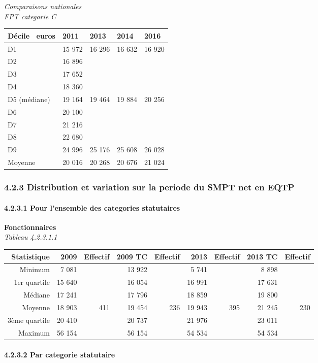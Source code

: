 \emph{Comparaisons nationales}\\
\emph{FPT categorie C}

\begin{longtable}[]{@{}lllll@{}}
\toprule
Décile ~euros & 2011 & 2013 & 2014 & 2016\tabularnewline
\midrule
\endhead
D1 & 15 972 & 16 296 & 16 632 & 16 920\tabularnewline
D2 & 16 896 & & &\tabularnewline
D3 & 17 652 & & &\tabularnewline
D4 & 18 360 & & &\tabularnewline
D5 (médiane) & 19 164 & 19 464 & 19 884 & 20 256\tabularnewline
D6 & 20 100 & & &\tabularnewline
D7 & 21 216 & & &\tabularnewline
D8 & 22 680 & & &\tabularnewline
D9 & 24 996 & 25 176 & 25 608 & 26 028\tabularnewline
Moyenne & 20 016 & 20 268 & 20 676 & 21 024\tabularnewline
\bottomrule
\end{longtable}

\hypertarget{distribution-et-variation-sur-la-periode-du-smpt-net-en-eqtp}{%
\subsubsection{4.2.3 Distribution et variation sur la periode du SMPT
net en
EQTP}\label{distribution-et-variation-sur-la-periode-du-smpt-net-en-eqtp}}

\hypertarget{pour-lensemble-des-categories-statutaires}{%
\paragraph{4.2.3.1 Pour l'ensemble des categories
statutaires}\label{pour-lensemble-des-categories-statutaires}}

\textbf{Fonctionnaires}\\
\hspace*{0.333em}\emph{Tableau 4.2.3.1.1}

\begin{longtable}[]{@{}rrrrrrrrr@{}}
\toprule
Statistique & 2009 & Effectif & 2009 TC & Effectif & 2013 & Effectif &
2013 TC & Effectif\tabularnewline
\midrule
\endhead
Minimum & 7 081 & & 13 922 & & 5 741 & & 8 898 &\tabularnewline
1er quartile & 15 640 & & 16 054 & & 16 991 & & 17 631 &\tabularnewline
Médiane & 17 241 & & 17 796 & & 18 859 & & 19 800 &\tabularnewline
Moyenne & 18 903 & 411 & 19 454 & 236 & 19 943 & 395 & 21 245 &
230\tabularnewline
3ème quartile & 20 410 & & 20 737 & & 21 976 & & 23 011 &\tabularnewline
Maximum & 56 154 & & 56 154 & & 54 534 & & 54 534 &\tabularnewline
\bottomrule
\end{longtable}

\hypertarget{par-categorie-statutaire-1}{%
\paragraph{4.2.3.2 Par categorie
statutaire}\label{par-categorie-statutaire-1}}

